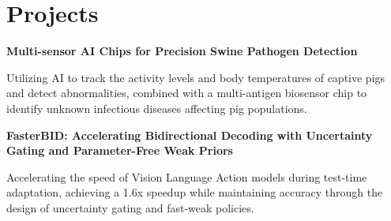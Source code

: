 \section{\textbf{Projects}}


\vspace{0.5mm}
\noindent \textbf{\small{Multi-sensor AI Chips for Precision Swine Pathogen Detection}}
\vspace{-4mm}

\resumeItemListStart
    \item{
        Utilizing AI to track the activity levels and body temperatures of captive pigs and detect abnormalities, combined with a multi-antigen biosensor chip to identify unknown infectious diseases affecting pig populations.
    }

 \resumeItemListEnd

 \vspace{0.5mm}
\noindent \textbf{\small{FasterBID: Accelerating Bidirectional Decoding with Uncertainty Gating and Parameter-Free Weak Priors}}
\vspace{-4mm}

\resumeItemListStart
    \item{
        Accelerating the speed of Vision Language Action models during test-time adaptation, achieving a 1.6x speedup while maintaining accuracy through the design of uncertainty gating and fast-weak policies.
    }

 \resumeItemListEnd


 \vspace{-6pt}